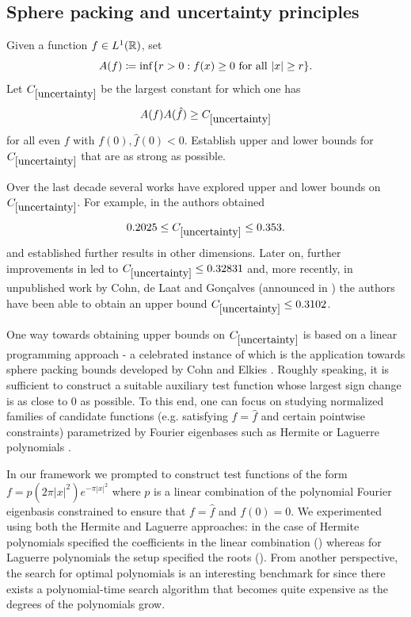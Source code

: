 \subsection{Sphere packing and uncertainty principles}

\renewcommand{\problemURL}{https://google-deepmind.github.io/alphaevolve_repository_of_problems/problems/11.html}

\begin{problem}\label{uncertainty} Given a function $f \in L^1(\mathbb{R})$, set
$$ A(f) \coloneqq \inf \{r > 0: f(x) \geq 0 \hbox{ for all } |x| \geq r \}.$$
Let $C_{\ref{uncertainty}}$ be the largest constant for which one has
$$ A(f) A(\hat f) \geq C_{\ref{uncertainty}}$$
for all even $f$ with $f(0), \hat f(0) < 0$.  Establish upper and lower bounds for $C_{\ref{uncertainty}}$ that are as strong as possible.
\end{problem}

Over the last decade several works have explored upper and lower bounds on $C_{\ref{uncertainty}}$. For example, in \cite{goncalves-etal} the authors obtained
$$ 0.2025 \leq C_{\ref{uncertainty}} \leq 0.353.$$
and established further results in other dimensions. Later on, further improvements in \cite{cohn-goncalves} led to $C_{\ref{uncertainty}} \leq 0.32831$ and, more recently, in unpublished work by Cohn, de Laat and Gonçalves (announced in \cite{GoncalvesSilvaRamos2023}) the authors have been able to obtain an upper bound $C_{\ref{uncertainty}} \leq 0.3102$.

One way towards obtaining upper bounds on $C_{\ref{uncertainty}}$ is based on a linear programming approach - a celebrated instance of which is the application towards sphere packing bounds developed by Cohn and Elkies \cite{cohn-elkies}. Roughly speaking, it is sufficient to construct a suitable auxiliary test function whose largest sign change is as close to $0$ as possible. To this end, one can focus on studying normalized families of candidate functions (e.g. satisfying $f = \hat f$ and certain pointwise constraints) parametrized by Fourier eigenbases such as Hermite \cite{goncalves-etal} or Laguerre polynomials \cite{cohn-goncalves}.

In our framework we prompted \AlphaEvolve to construct test functions of the form $f = p(2 \pi |x|^2) e^{-\pi |x|^2}$ where $p$ is a linear combination of the polynomial Fourier eigenbasis constrained to ensure that $f = \hat f$ and $f(0) = 0$. We experimented using both the Hermite and Laguerre approaches: in the case of Hermite polynomials \AlphaEvolve specified the coefficients in the linear combination (\cite{goncalves-etal}) whereas for Laguerre polynomials the setup specified the roots (\cite{cohn-goncalves}). From another perspective, the search for optimal polynomials is an interesting benchmark for \AlphaEvolve since there exists a polynomial-time search algorithm that becomes quite expensive as the degrees of the polynomials grow.

